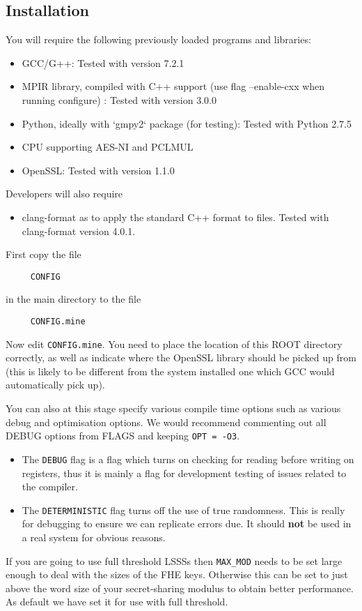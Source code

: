 
\subsection{Installation}
You will require the following previously loaded programs and 
libraries:
\begin{itemize}
\item GCC/G++: Tested with version 7.2.1
\item MPIR library, compiled with C++ support (use flag --enable-cxx when running configure) : Tested with version 3.0.0
\item Python, ideally with `gmpy2` package (for testing): Tested with Python 2.7.5
\item CPU supporting AES-NI and PCLMUL
\item OpenSSL: Tested with version 1.1.0
\end{itemize}
Developers will also require
\begin{itemize}
\item clang-format as to apply the standard C++ format to files. Tested with clang-format version 4.0.1.
\end{itemize}
First copy the file
\begin{verbatim}
     CONFIG
\end{verbatim}
in the main directory to the file
\begin{verbatim}
     CONFIG.mine
\end{verbatim}
Now edit \verb+CONFIG.mine+.
You need to place the location of this ROOT directory correctly, 
as well as indicate where the OpenSSL library should be picked up 
from (this is likely to be different from the
system installed one which GCC would automatically pick up).

You can also at this stage specify various compile time options
such as various debug and optimisation options.
We would recommend commenting out all DEBUG options from FLAGS
and keeping \verb+OPT = -O3+.
\begin{itemize}
\item The \verb+DEBUG+ flag is a flag which turns on checking for 
reading before writing on registers, thus it is mainly a flag
for development testing of issues related to the compiler.
\item The \verb+DETERMINISTIC+ flag turns off the use of true randomness.
This is really for debugging to ensure we can replicate errors due.
It should {\bf not} be used in a real system for obvious reasons.
\end{itemize}
If you are going to use full threshold LSSSs then \verb+MAX_MOD+
needs to be set large enough to deal with the sizes of the FHE
keys. Otherwise this can be set to just above the word size of your
secret-sharing modulus to obtain better performance.
As default we have set it for use with full threshold.

